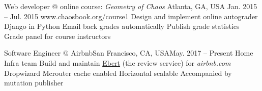 


\begin{cventries}

\cvindustry
{Web developer @ online course: \emph{Geometry of Chaos}}
{Atlanta, GA, USA}
{Jan. 2015 -- Jul. 2015}
{www.chaosbook.org/course1}
{
	\cvindustryitem
	{Design and implement online autograder}
	{Django in Python}
	{{\bullet} Email back grades automatically {\bullet} Publish grade statistics {\bullet} Grade panel for course instructors}
}

\cvindustry
{Software Engineer @ Airbnb}{San Francisco, CA, USA}{May. 2017 -- Present}
{Home Infra team}
{
	\cvindustryitem
	{Build and maintain \underline{Ebert} (the review service) for \emph{airbnb.com}}
	{Dropwizard}
	{{\bullet} Mcrouter cache enabled {\bullet} Horizontal scalable {\bullet} Accompanied by mutation publisher}
}

\end{cventries}
